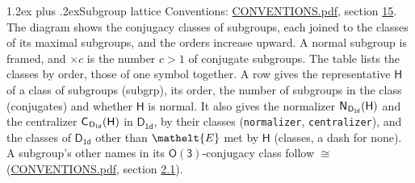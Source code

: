 \documentclass[10pt,a4paper]{article}
\makeatletter
\renewcommand\section{\@startsection{section}{1}{\z@}{-3ex plus -1ex minus -.2ex}%
  {1.2ex plus .2ex}{\normalfont\large\sffamily\bfseries\color{parttitle}}}
\numberwithin{equation}{section}
\newcommand{\eltfont}[1]{{\let\sigma\eltsigma\mathelt{#1}}}
\newcommand{\grp}[1]{\mathsf{#1}}
\newcommand{\cls}[1]{\eltfont{#1}}
\newcommand{\samecls}{\cong}
\newcommand{\hairsp}{\mkern1mu}
\makeatother
\begin{document}
\section{Subgroup lattice}\label{s:subgroups}
Conventions: \href{../../CONVENTIONS.pdf}{CONVENTIONS.pdf}, section \href{../../CONVENTIONS.pdf\#conv.15}{15}.
The diagram shows the conjugacy classes of subgroups, each joined to the classes of its maximal subgroups, and the orders increase upward. \label{n:index.conjugates.c}A normal subgroup is framed, and ${\times}c$ is the number $c > 1$ of conjugate subgroups. The table lists the classes by order, those of one symbol together. \label{n:group.H}\label{n:head.subgroup}\label{n:head.order}\label{n:head.conjugates}\label{n:head.normal}A row gives the representative $\grp{H}$ of a class of subgroups (subgrp), its order, the number of subgroups in the class (conjugates) and whether $\grp{H}$ is normal. \label{n:group.normalizer}\label{n:group.centralizer}\label{n:head.classes}It also gives the normalizer $\grp{N}_{\hairsp \grp{D_{1d}}}(\grp{H})$ and the centralizer $\grp{C}_{\hairsp \grp{D_{1d}}}(\grp{H})$ in $\grp{D_{1d}}$, by their classes (\texttt{normalizer}, \texttt{centralizer}), and the classes of $\grp{D_{1d}}$ other than $\cls{E}$ met by $\grp{H}$ (classes, a dash for none). A subgroup's other names in its \href{O3.pdf}{$\grp{O(3)}$}-conjugacy class follow $\samecls$ (\href{../../CONVENTIONS.pdf}{CONVENTIONS.pdf}, section \href{../../CONVENTIONS.pdf\#conv.2.1}{2.1}).
\begin{center}
\end{center}
\end{document}
